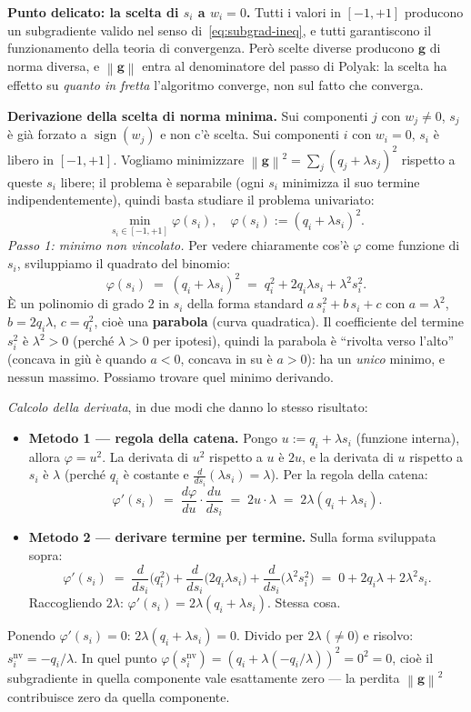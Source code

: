 \documentclass[11pt,a4paper]{article}
\newcommand{\norm}[1]{\left\|#1\right\|}
\newcommand{\bg}{\mathbf{g}}
\theoremstyle{definition}
\begin{document}
\begin{tcolorbox}[warning]
\textbf{Punto delicato: la scelta di $s_i$ a $w_i=0$.} Tutti i valori in $[-1,+1]$ producono un subgradiente valido nel senso di~\eqref{eq:subgrad-ineq}, e tutti garantiscono il funzionamento della teoria di convergenza. Però scelte diverse producono $\bg$ di norma diversa, e $\norm{\bg}$ entra al denominatore del passo di Polyak: la scelta ha effetto su \emph{quanto in fretta} l'algoritmo converge, non sul fatto che converga.

\smallskip
\textbf{Derivazione della scelta di norma minima.} Sui componenti $j$ con $w_j\ne 0$, $s_j$ è già forzato a $\operatorname{sign}(w_j)$ e non c'è scelta. Sui componenti $i$ con $w_i = 0$, $s_i$ è libero in $[-1, +1]$. Vogliamo minimizzare $\norm{\bg}^2 = \sum_j(q_j+\lambda s_j)^2$ rispetto a queste $s_i$ libere; il problema è separabile (ogni $s_i$ minimizza il suo termine indipendentemente), quindi basta studiare il problema univariato:
\[
\min_{s_i\in[-1,+1]} \varphi(s_i),\quad \varphi(s_i) := (q_i + \lambda s_i)^2.
\]
\emph{Passo 1: minimo non vincolato.} Per vedere chiaramente cos'è $\varphi$ come funzione di $s_i$, sviluppiamo il quadrato del binomio:
\[
\varphi(s_i) \;=\; (q_i+\lambda s_i)^2 \;=\; q_i^2 + 2 q_i\lambda s_i + \lambda^2 s_i^2.
\]
È un polinomio di grado $2$ in $s_i$ della forma standard $a\,s_i^2 + b\,s_i + c$ con $a = \lambda^2$, $b = 2 q_i\lambda$, $c = q_i^2$, cioè una \textbf{parabola} (curva quadratica). Il coefficiente del termine $s_i^2$ è $\lambda^2 > 0$ (perché $\lambda > 0$ per ipotesi), quindi la parabola è ``rivolta verso l'alto'' (concava in giù è quando $a<0$, concava in su è $a>0$): ha un \emph{unico} minimo, e nessun massimo. Possiamo trovare quel minimo derivando.

\emph{Calcolo della derivata}, in due modi che danno lo stesso risultato:
\begin{itemize}[leftmargin=*,nosep]
\item \textbf{Metodo 1 — regola della catena.} Pongo $u := q_i + \lambda s_i$ (funzione interna), allora $\varphi = u^2$. La derivata di $u^2$ rispetto a $u$ è $2u$, e la derivata di $u$ rispetto a $s_i$ è $\lambda$ (perché $q_i$ è costante e $\frac{d}{ds_i}(\lambda s_i) = \lambda$). Per la regola della catena:
\[
\varphi'(s_i) \;=\; \frac{d\varphi}{du}\cdot\frac{du}{ds_i} \;=\; 2u\cdot\lambda \;=\; 2\lambda(q_i+\lambda s_i).
\]
\item \textbf{Metodo 2 — derivare termine per termine.} Sulla forma sviluppata sopra:
\[
\varphi'(s_i) \;=\; \frac{d}{ds_i}\bigl(q_i^2\bigr) + \frac{d}{ds_i}\bigl(2 q_i\lambda s_i\bigr) + \frac{d}{ds_i}\bigl(\lambda^2 s_i^2\bigr) \;=\; 0 + 2 q_i\lambda + 2\lambda^2 s_i.
\]
Raccogliendo $2\lambda$: $\varphi'(s_i) = 2\lambda(q_i + \lambda s_i)$. Stessa cosa.
\end{itemize}
Ponendo $\varphi'(s_i) = 0$: $2\lambda(q_i + \lambda s_i) = 0$. Divido per $2\lambda$ ($\ne 0$) e risolvo: $s_i^{\text{nv}} = -q_i/\lambda$. In quel punto $\varphi(s_i^{\text{nv}}) = (q_i + \lambda(-q_i/\lambda))^2 = 0^2 = 0$, cioè il subgradiente in quella componente vale esattamente zero --- la perdita $\norm{\bg}^2$ contribuisce zero da quella componente.


\end{tcolorbox}
\end{document}
